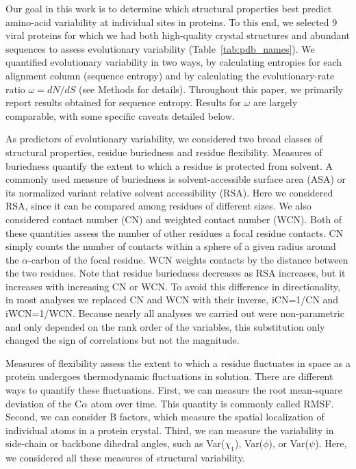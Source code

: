 \documentclass[12pt]{article}
\begin{document}
Our goal in this work is to determine which structural properties best predict amino-acid variability at individual sites in proteins. To this end, we selected 9 viral proteins for which we had both high-quality crystal structures and abundant sequences to assess evolutionary variability (Table~\ref{tab:pdb_names}). We quantified evolutionary variability in two ways, by calculating entropies for each alignment column (sequence entropy) and by calculating the evolutionary-rate ratio $\omega=dN/dS$ (see Methods for details). Throughout this paper, we primarily report results obtained for sequence entropy. Results for $\omega$ are largely comparable, with some specific caveats detailed below.

As predictors of evolutionary variability, we considered two broad classes of structural properties, residue buriedness and residue flexibility. Measures of buriedness quantify the extent to which a residue is protected from solvent. A commonly used measure of buriedness is solvent-accessible surface area (ASA) or its normalized variant relative solvent accessibility (RSA). Here we considered RSA, since it can be compared among residues of different sizes. We also considered contact number (CN) and weighted contact number (WCN). Both of these quantities assess the number of other residues a focal residue contacts. CN simply counts the number of contacts within a sphere of a given radius around the $\alpha$-carbon of the focal residue. WCN weights contacts by the distance between the two residues. Note that residue buriedness decreases as RSA increases, but it increases with increasing CN or WCN. To avoid this difference in directionality, in most analyses we replaced CN and WCN with their inverse, iCN=1/CN and iWCN=1/WCN. Because nearly all analyses we carried out were non-parametric and only depended on the rank order of the variables, this substitution only changed the sign of correlations but not the magnitude.

Measures of flexibility assess the extent to which a residue fluctuates in space as a protein undergoes thermodynamic fluctuations in solution. There are different ways to quantify these fluctuations. First, we can measure the root mean-square deviation of the C$\alpha$ atom over time. This quantity is commonly called RMSF. Second, we can consider B factors, which measure the spatial localization of individual atoms in a protein crystal. Third, we can measure the variability in side-chain or backbone dihedral angles, such as Var($\chi_1$), Var($\phi$), or Var($\psi$). Here, we considered all these measures of structural variability.
\end{document}
